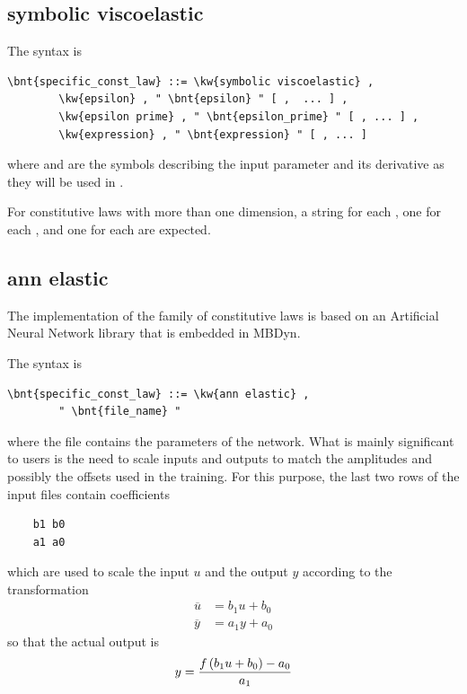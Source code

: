 \subsection{symbolic viscoelastic}\label{sec:CL:SYMBOLIC-VISCOELASTIC}
The syntax is
\begin{Verbatim}[commandchars=\\\{\}]
    \bnt{specific_const_law} ::= \kw{symbolic viscoelastic} ,
        \kw{epsilon} , " \bnt{epsilon} " [ ,  ... ] ,
        \kw{epsilon prime} , " \bnt{epsilon_prime} " [ , ... ] ,
        \kw{expression} , " \bnt{expression} " [ , ... ]
\end{Verbatim}
where  and  are the symbols describing 
the input parameter and its derivative as they will be used
in .

For constitutive laws with more than one dimension,
a string for each , one for each ,
and one for each  are expected.

\subsection{ann elastic}\label{sec:CL:ANN-ELASTIC}
The implementation  of the family of  constitutive laws
is based on an Artificial Neural Network library that is embedded in MBDyn.

The syntax is
\begin{Verbatim}[commandchars=\\\{\}]
    \bnt{specific_const_law} ::= \kw{ann elastic} ,
        " \bnt{file_name} "
\end{Verbatim}
where the file  contains the parameters of the network.
What is mainly significant to users is the need to scale inputs and outputs
to match the amplitudes and possibly the offsets used in the training.
For this purpose, the last two rows of the input files contain coefficients
\begin{verbatim}
    b1 b0
    a1 a0
\end{verbatim}
which are used to scale the input $u$ and the output $y$ according
to the transformation
\begin{align}
	\overline{u} &= b_1 u + b_0 \\
	\overline{y} &= a_1 y + a_0
\end{align}
so that the actual output is
\begin{equation}
	y = \frac{f\left( b_1 u + b_0 \right) - a_0}{a_1}
\end{equation}

